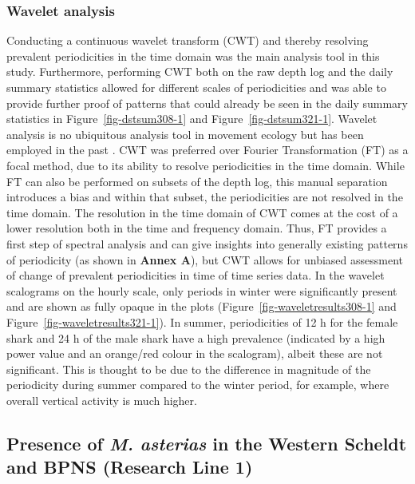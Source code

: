 \documentclass[
  authoryear,
  review,
  3p]{elsarticle}
\begin{document}
\hypertarget{sec-disc-reflection-wavelet}{%
\subsubsection{Wavelet analysis}\label{sec-disc-reflection-wavelet}}

Conducting a continuous wavelet transform (CWT) and thereby resolving
prevalent periodicities in the time domain was the main analysis tool in
this study. Furthermore, performing CWT both on the raw depth log and
the daily summary statistics allowed for different scales of
periodicities and was able to provide further proof of patterns that
could already be seen in the daily summary statistics in
Figure~\ref{fig-dstsum308-1} and Figure~\ref{fig-dstsum321-1}. Wavelet
analysis is no ubiquitous analysis tool in movement ecology but has been
employed in the past \citep{wittemyer_2008, zhang_2020}. CWT was
preferred over Fourier Transformation (FT) as a focal method, due to its
ability to resolve periodicities in the time domain. While FT can also
be performed on subsets of the depth log, this manual separation
introduces a bias and within that subset, the periodicities are not
resolved in the time domain. The resolution in the time domain of CWT
comes at the cost of a lower resolution both in the time and frequency
domain. Thus, FT provides a first step of spectral analysis and can give
insights into generally existing patterns of periodicity (as shown in
\textbf{Annex A}), but CWT allows for unbiased assessment of change of
prevalent periodicities in time of time series data. In the wavelet
scalograms on the hourly scale, only periods in winter were
significantly present and are shown as fully opaque in the plots
(Figure~\ref{fig-waveletresults308-1} and
Figure~\ref{fig-waveletresults321-1}). In summer, periodicities of 12 h
for the female shark and 24 h of the male shark have a high prevalence
(indicated by a high power value and an orange/red colour in the
scalogram), albeit these are not significant. This is thought to be due
to the difference in magnitude of the periodicity during summer compared
to the winter period, for example, where overall vertical activity is
much higher.

\hypertarget{sec-disc-seasonalpresencefemales}{%
\subsection{\texorpdfstring{Presence of \emph{M. asterias} in the
Western Scheldt and BPNS (Research Line
1)}{Presence of M. asterias in the Western Scheldt and BPNS (Research Line 1)}}\label{sec-disc-seasonalpresencefemales}}
\end{document}
